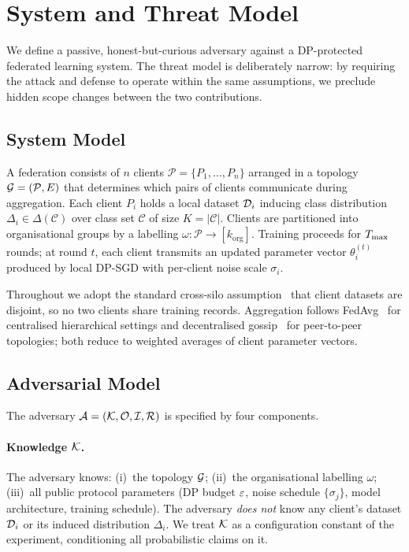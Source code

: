 \section{System and Threat Model}
\label{sec:threat}

We define a passive, honest-but-curious adversary against a DP-protected
federated learning system. The threat model is deliberately narrow: by
requiring the attack and defense to operate within the same assumptions,
we preclude hidden scope changes between the two contributions.

\subsection{System Model}
\label{sec:system-model}

A federation consists of $n$ clients $\mathcal{P} = \{P_1,\ldots,P_n\}$
arranged in a topology $\mathcal{G}=(\mathcal{P},E)$ that determines which
pairs of clients communicate during aggregation. Each client $P_i$ holds
a local dataset $\mathcal{D}_i$ inducing class distribution
$\Delta_i \in \Delta(\mathcal{C})$ over class set $\mathcal{C}$ of size
$K=|\mathcal{C}|$. Clients are partitioned into organisational groups
by a labelling $\omega:\mathcal{P}\to[k_{\mathrm{org}}]$. Training proceeds
for $T_{\max}$ rounds; at round $t$, each client transmits an updated
parameter vector $\theta_i^{(t)}$ produced by local DP-SGD with
per-client noise scale $\sigma_i$.

Throughout we adopt the standard cross-silo
assumption~\cite{wang2021fieldguide} that client datasets are disjoint,
so no two clients share training records. Aggregation follows
FedAvg~\cite{mcmahan2018dpfedavg} for centralised hierarchical settings
and decentralised gossip~\cite{hegedus2021decentralized} for
peer-to-peer topologies; both reduce to weighted averages of client
parameter vectors.

\subsection{Adversarial Model}
\label{sec:adv-model}

The adversary $\mathcal{A} = (\mathcal{K}, \mathcal{O}, \mathcal{I}, \mathcal{R})$ is
specified by four components.

\paragraph{Knowledge $\mathcal{K}$.} The adversary knows: (i)~the topology
$\mathcal{G}$; (ii)~the organisational labelling $\omega$; (iii)~all public
protocol parameters (DP budget $\varepsilon$, noise schedule
$\{\sigma_j\}$, model architecture, training schedule). The adversary
\emph{does not} know any client's dataset $\mathcal{D}_i$ or its induced
distribution $\Delta_i$. We treat $\mathcal{K}$ as a configuration constant of
the experiment, conditioning all probabilistic claims on it.

